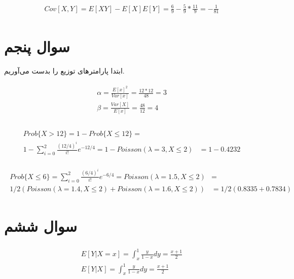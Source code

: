 \documentclass[paper=a4, fontsize=11pt]{article}
\numberwithin{equation}{section} %
\numberwithin{figure}{section} %
\numberwithin{table}{section} %
\begin{document}
\begin{align}
\begin{split}
    Cov[X,Y] = E[XY] - E[X]E[Y] = \frac{6}{9} - \frac{5}{9} * \frac{11}{9} = -\frac{1}{81}
\end{split}
\end{align}

\section{سوال پنجم}
ابتدا پارامتر‌های توزیع را بدست می‌آوریم.

\begin{align}
\begin{split}
    \alpha = \frac{E[x]^2}{Var[x]} = \frac{12 * 12}{48} = 3\\
    \beta = \frac{Var[X]}{E[x]} = \frac{48}{12} = 4\\
\end{split}
\end{align}

\begin{align}
\begin{split}
    Prob\{X > 12\} = 1 - Prob\{X \le 12\} =&\\
    1 - \sum_{i=0}^{2} \frac{(12/4)^i}{i!} e^{-12/4} = 1 - Poisson(\lambda = 3, X \le 2)
    &= 1 - 0.4232
\end{split}
\end{align}

\begin{align}
\begin{split}
    Prob\{X \le 6\} = \sum_{i=0}^{2} \frac{(6/4)^i}{i!} e^{-6/4} = Poisson(\lambda = 1.5, X \le 2) &=\\
    1/2 (Poisson(\lambda = 1.4, X \le 2) + Poisson(\lambda = 1.6, X \le 2)) &= 1/2(0.8335 + 0.7834)
\end{split}
\end{align}

\section{سوال ششم}
\begin{align}
\begin{split}
    E[Y|X = x] = \int_{x}^{1} \frac{y}{1-x} dy = \frac{x + 1}{2} \\
    E[Y|X] = \int_{x}^{1} \frac{y}{1-x} dy = \frac{x + 1}{2}
\end{split}
\end{align}
\end{document}
